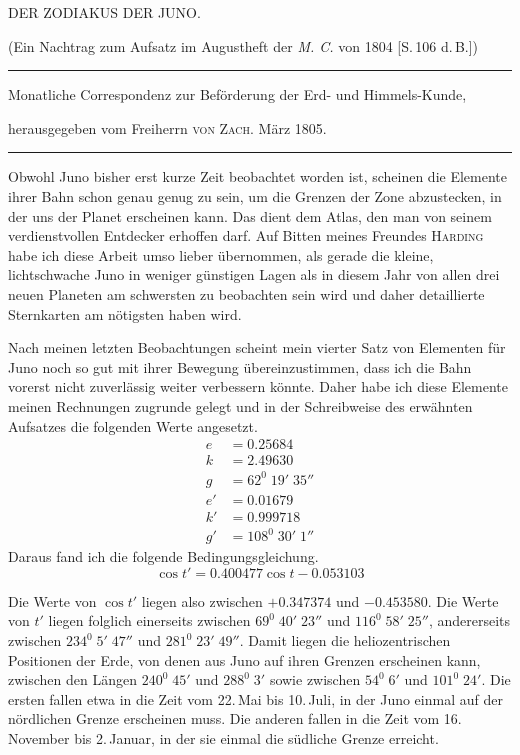 \clearpage{}%
\begin{center}
{\small DER ZODIAKUS DER JUNO.\par}
\medskip
{\small (Ein Nachtrag zum Aufsatz im Augustheft der \textit{M. C.} von 1804 [S.\,106 d.\,B.])\par}
\medskip\hrule\medskip
{\small Monatliche Correspondenz zur Beförderung der Erd- und Himmels-Kunde,\par
herausgegeben vom Freiherrn \textsc{von Zach}. März 1805.\par}
\medskip\hrule
\end{center}\medskip
Obwohl Juno bisher erst kurze Zeit beobachtet worden ist, scheinen
die Elemente ihrer Bahn schon genau genug zu sein, um die Grenzen
der Zone abzustecken, in der uns der Planet erscheinen kann. Das
dient dem Atlas, den man von seinem verdienstvollen Entdecker
erhoffen darf. Auf Bitten meines Freundes \textsc{Harding} habe ich
diese Arbeit umso lieber übernommen, als gerade die kleine,
lichtschwache Juno in weniger günstigen Lagen als in diesem Jahr von
allen drei neuen Planeten am schwersten zu beobachten sein wird und
daher detaillierte Sternkarten am nötigsten haben wird.

Nach meinen letzten Beobachtungen scheint mein vierter Satz von
Elementen für Juno noch so gut mit ihrer Bewegung übereinzustimmen,
dass ich die Bahn vorerst nicht zuverlässig weiter verbessern
könnte. Daher habe ich diese Elemente meinen Rechnungen zugrunde
gelegt und in der Schreibweise des erwähnten Aufsatzes die folgenden
Werte angesetzt.
\[
\begin{aligned}
e&=0.25684\\
k&=2.49630\\
g&=62^0\;19'\;35''\\
e'&=0.01679\\
k'&=0.999718\\
g'&=108^0\;30'\;1''
\end{aligned}
\]
%
Daraus fand ich die folgende Bedingungsgleichung.
\[
\cos t'=0.400477\cos t-0.053103
\]

Die Werte von $\cos t'$ liegen also zwischen $+0.347374$ und
$-0.453580$. Die Werte von $t'$ liegen folglich einerseits zwischen
$69^0\;40'\;23''$ und $116^0\;58'\;25''$, andererseits zwischen
$234^0\;5'\;47''$ und $281^0\;23'\;49''$. Damit liegen die
heliozentrischen Positionen der Erde, von denen aus Juno auf ihren
Grenzen erscheinen kann, zwischen den Längen $240^0\;45'$ und
$288^0\;3'$ sowie zwischen $54^0\;6'$ und $101^0\;24'$. Die ersten
fallen etwa in die Zeit vom 22.\,Mai bis 10.\,Juli, in der Juno
einmal auf der nördlichen Grenze erscheinen muss. Die anderen fallen
in die Zeit vom 16.\,November bis 2.\,Januar, in der sie einmal die
südliche Grenze erreicht.

